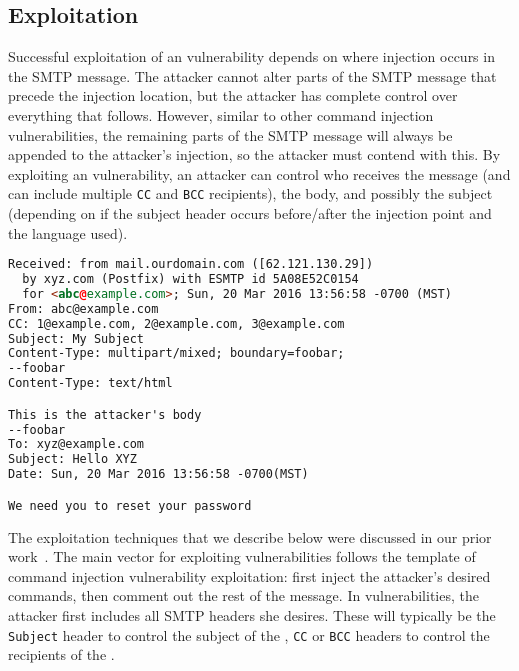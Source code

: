
\subsection{Exploitation}

\label{exploitation}
Successful exploitation of an \ehi vulnerability depends on where
injection occurs in the SMTP message. The attacker cannot alter parts
of the SMTP message that precede the injection location, but the
attacker has complete control over everything that follows. However,
similar to other command injection vulnerabilities, the remaining
parts of the SMTP message will always be appended to the attacker's
injection, so the attacker must contend with this. By
exploiting an \ehi vulnerability, an attacker can control who receives
the message (and can include multiple \texttt{CC} and \texttt{BCC}
recipients), the body, and possibly the subject (depending on if the subject header occurs
before/after the injection point and the language used).

\begin{lstlisting}[language=HTML,caption={Exploiting the \ehi
      vulnerability in Listing~\ref{code:phpemi} to control the
      recipients, subject, and body of the SMTP message.},label={code:ehiexploit}, float]
Received: from mail.ourdomain.com ([62.121.130.29])
  by xyz.com (Postfix) with ESMTP id 5A08E52C0154
  for <abc@example.com>; Sun, 20 Mar 2016 13:56:58 -0700 (MST)
From: abc@example.com
CC: 1@example.com, 2@example.com, 3@example.com
Subject: My Subject
Content-Type: multipart/mixed; boundary=foobar;
--foobar
Content-Type: text/html

This is the attacker's body
--foobar
To: xyz@example.com
Subject: Hello XYZ
Date: Sun, 20 Mar 2016 13:56:58 -0700(MST)

We need you to reset your password
\end{lstlisting}

The exploitation techniques that we describe below were discussed in our prior work~\cite{saipc2017}.
The main vector for exploiting \ehi vulnerabilities follows the
template of command injection vulnerability exploitation: first inject
the attacker's desired commands, then comment out the rest of the
message. In \ehi vulnerabilities, the attacker first includes all SMTP
headers she desires. These will typically be the \lstinline{Subject}
header to control the subject of the \email\footnotemark, \lstinline{CC}
or \lstinline{BCC} headers to control the recipients of the \email.


